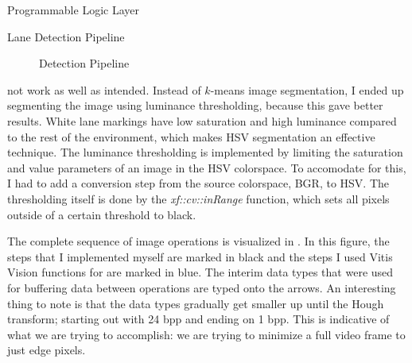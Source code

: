\documentclass{matthijs}
\begin{document}
\begin{hoofdstuk}{Programmable Logic Layer}
\begin{paragraaf}{Lane Detection Pipeline}
\begin{figure}
				\vspace{-2.5ex}
				\caption{Detection Pipeline}
				\label{figuur:Detection Pipeline}
			\end{figure}
			not work as well as intended.
			Instead of $ k $-means image segmentation, I ended up segmenting the image using luminance thresholding, because this gave better results.
			White lane markings have low saturation and high luminance compared to the rest of the environment, which makes HSV segmentation an effective technique.
			The luminance thresholding is implemented by limiting the saturation and value parameters of an image in the HSV colorspace.
			To accomodate for this, I had to add a conversion step from the source colorspace, BGR, to HSV.
			The thresholding itself is done by the \textit{xf::cv::inRange} function, which sets all pixels outside of a certain threshold to black.

			\bigskip

			The complete sequence of image operations is visualized in .
			In this figure, the steps that I implemented myself are marked in black and the steps I used Vitis Vision functions for are marked in blue.
			The interim data types that were used for buffering data between operations are typed onto the arrows.
			An interesting thing to note is that the data types gradually get smaller up until the Hough transform; starting out with 24 bpp and ending on 1 bpp.
			This is indicative of what we are trying to accomplish: we are trying to minimize a full video frame to just edge pixels.
			

\end{paragraaf}
\end{hoofdstuk}
\end{document}
